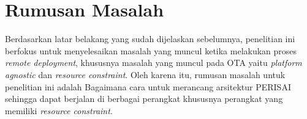 \section{Rumusan Masalah}

Berdasarkan latar belakang yang sudah dijelaskan sebelumnya, penelitian ini berfokus untuk menyelesaikan masalah yang muncul ketika melakukan proses \textit{remote deployment}, khususnya masalah yang muncul pada OTA yaitu \textit{platform agnostic} dan \textit{resource constraint}. Oleh karena itu, rumusan masalah untuk penelitian ini adalah Bagaimana cara untuk merancang arsitektur PERISAI sehingga dapat berjalan di berbagai perangkat khususnya perangkat yang memiliki \textit{resource constraint}.